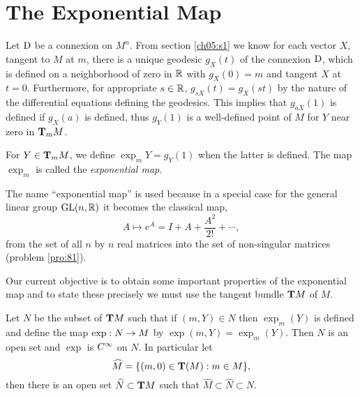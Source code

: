 \documentclass[../main]{subfiles}
\begin{document}
\section{The Exponential Map}\label{ch09:s3}

Let $\D$ be a connexion on $M^n$. From section \ref{ch05:s1} we know for each vector $X$, tangent to $M$ at $m$, there is a unique geodesic $g_X(t)$ of the connexion $\D$, which is defined on a neighborhood of zero in $\bR$ with $g_X(0) = m$ and tangent $X$ at $t=0$. Furthermore, for appropriate $s \in \bR$, $g_{sX}(t) = g_X(st)$ by the nature of the differential equations defining the geodesics. This implies that $g_{aX}(1)$ is defined if $g_X(a)$ is defined, thus $g_Y(1)$ is a well-defined point of $M$ for $Y$ near zero in $\tangentspace{M}{m}$.

\begin{definition}
For $Y \in \tangentspace{M}{m}$, we define $\exp_mY=g_Y(1)$ when the latter is defined. The map $\exp_m$ is called the \emph{exponential map}. 
\end{definition}

The name ``exponential map'' is used because in a special case for the general linear group $\GL(n, \bR)$  it becomes the classical map,
\[ A \mapsto e^A = I + A + \frac{A^2}{2!} + \cdots ,\]
from the set of all $n$ by $n$ real matrices into the set of non-singular matrices (problem \ref{pro:81}).

Our current objective is to obtain some important properties of the exponential map and to state these precisely we must use the tangent bundle $\tangentbundle{M}$ of $M$.

\begin{proposition} \label{prop:ch9.3.1}
Let $N$ be the subset of $\tangentbundle{M}$ such that if $(m,Y) \in N$ then $\exp_m(Y)$ is defined and define the map $\exp : N \functionMaps M$ by $\exp(m, Y) = \exp_m(Y)$. Then $N$ is an open set and $\exp$ is $\CInfty$ on $N$. In particular let \[\widehat M = \{(m, 0) \in \tangentbundle(M) : m\in M\},\] then there is an open set $\widehat N \subset \tangentbundle M$ such that $\widehat M \subset \widehat N \subset N$.
\end{proposition} \label{pro:CH09S3.1}
\end{document}
